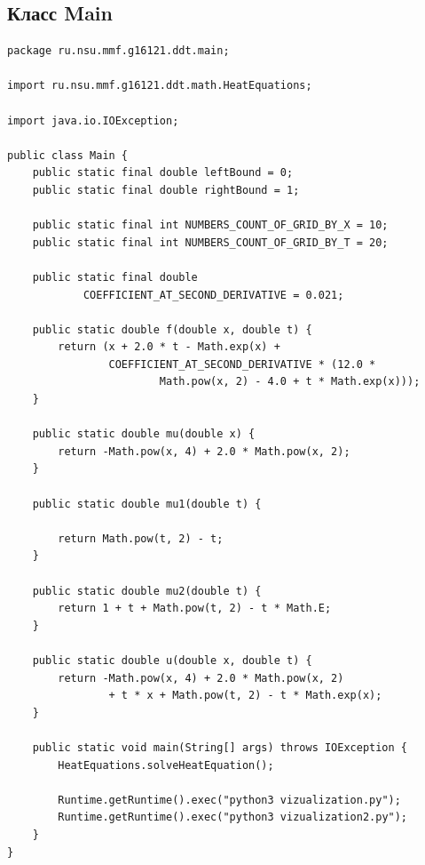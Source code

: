 \documentclass[12pt,a4paper]{scrartcl}
\begin{document}
\subsection{Класс  Main}
\begin{verbatim}
package ru.nsu.mmf.g16121.ddt.main;

import ru.nsu.mmf.g16121.ddt.math.HeatEquations;

import java.io.IOException;

public class Main {
    public static final double leftBound = 0;
    public static final double rightBound = 1;

    public static final int NUMBERS_COUNT_OF_GRID_BY_X = 10;
    public static final int NUMBERS_COUNT_OF_GRID_BY_T = 20;

    public static final double 
            COEFFICIENT_AT_SECOND_DERIVATIVE = 0.021;

    public static double f(double x, double t) {
        return (x + 2.0 * t - Math.exp(x) + 
                COEFFICIENT_AT_SECOND_DERIVATIVE * (12.0 * 
                        Math.pow(x, 2) - 4.0 + t * Math.exp(x)));
    }

    public static double mu(double x) {
        return -Math.pow(x, 4) + 2.0 * Math.pow(x, 2);
    }

    public static double mu1(double t) {
        
        return Math.pow(t, 2) - t;
    }

    public static double mu2(double t) {
        return 1 + t + Math.pow(t, 2) - t * Math.E;
    }

    public static double u(double x, double t) {
        return -Math.pow(x, 4) + 2.0 * Math.pow(x, 2) 
                + t * x + Math.pow(t, 2) - t * Math.exp(x);
    }

    public static void main(String[] args) throws IOException {
        HeatEquations.solveHeatEquation();

        Runtime.getRuntime().exec("python3 vizualization.py");
        Runtime.getRuntime().exec("python3 vizualization2.py");
    }
}

\end{verbatim}
  \newpage  
\end{document}
